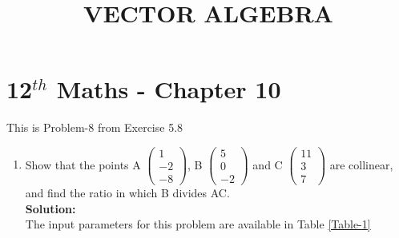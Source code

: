 \documentclass[12pt]{article}
\newcommand{\solution}{\noindent \textbf{Solution: }}
\newcommand{\myvec}[1]{\ensuremath{\begin{pmatrix}#1\end{pmatrix}}}
\begin{document}
\begin{center}
\title{\textbf{VECTOR ALGEBRA}}
\date{\vspace{-5ex}} %
\maketitle
\end{center}

\setcounter{page}{1}

\section*{12$^{th}$ Maths - Chapter 10}

This is Problem-8 from Exercise 5.8

 
\begin{enumerate}

	\item Show that the points A $\myvec{1\\-2\\-8}$, B $\myvec{5\\0\\-2}$ and C $\myvec{11\\3\\7}$ are collinear, and find the ratio in which B divides AC.\\


\solution \\The input parameters for this problem are available in Table \ref{Table-1}
\begin{table}[ht!]

\caption{}
\label{Table-1}	

\end{table}


\end{enumerate}
\end{document}
